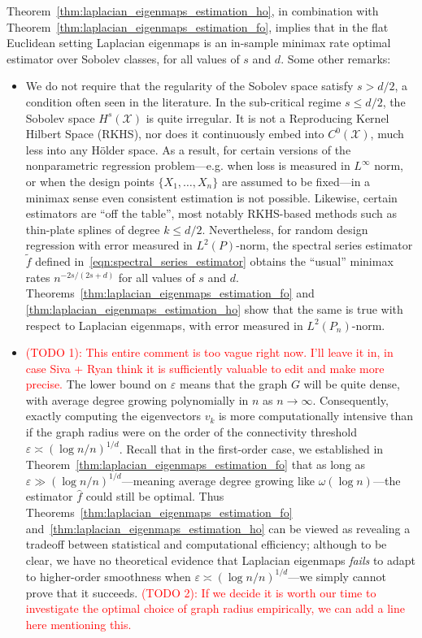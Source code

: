 \documentclass{article}
\newcommand{\1}{\mathbf{1}}
\newcommand{\Leb}{L}
\newcommand{\mc}[1]{\mathcal{#1}}
\newcommand{\wt}[1]{\widetilde{#1}}
\newcommand{\wh}[1]{\widehat{#1}}
\theoremstyle{alden}
\theoremstyle{aldenthm}
\theoremstyle{definition}
\theoremstyle{remark}
\begin{document}
Theorem~\ref{thm:laplacian_eigenmaps_estimation_ho}, in combination with Theorem~\ref{thm:laplacian_eigenmaps_estimation_fo}, implies that in the flat Euclidean setting Laplacian eigenmaps is an in-sample minimax rate optimal estimator over Sobolev classes, for all values of $s$ and $d$. Some other remarks:
\begin{itemize}
	\item We do not require that the regularity of the Sobolev space satisfy $s > d/2$, a condition often seen in the literature. In the sub-critical regime $s \leq d/2$, the Sobolev space $H^s(\mc{X})$ is quite irregular. It is not a Reproducing Kernel Hilbert Space (RKHS), nor does it continuously embed into $C^0(\mc{X})$, much less into any H\"{o}lder space. As a result, for certain versions of the nonparametric regression problem---e.g. when loss is measured in $\Leb^{\infty}$ norm, or when the design points $\{X_1,\ldots,X_n\}$ are assumed to be fixed---in a minimax sense even consistent estimation is not possible. Likewise, certain estimators are ``off the table'', most notably RKHS-based methods such as thin-plate splines of degree $k \leq d/2$. Nevertheless, for random design regression with error measured in $\Leb^2(P)$-norm, the spectral series estimator $\wt{f}$ defined in~\eqref{eqn:spectral_series_estimator} obtains the ``usual'' minimax rates $n^{-2s/(2s + d)}$ for all values of $s$ and $d$. Theorems~\ref{thm:laplacian_eigenmaps_estimation_fo} and \ref{thm:laplacian_eigenmaps_estimation_ho} show that the same is true with respect to Laplacian eigenmaps, with error measured in $\Leb^2(P_n)$-norm.
	\item \textcolor{red}{(TODO 1): This entire comment is too vague right now. I'll leave it in, in case Siva + Ryan think it is sufficiently valuable to edit and make more precise.} The lower bound on $\varepsilon$ means that the graph $G$ will be quite dense, with average degree growing polynomially in $n$ as $n \to \infty$. Consequently, exactly computing the eigenvectors $v_k$ is more computationally intensive than if the graph radius were on the order of the connectivity threshold $\varepsilon \asymp (\log n/n)^{1/d}$. Recall that in the first-order case, we established in Theorem~\ref{thm:laplacian_eigenmaps_estimation_fo} that as long as $\varepsilon \gg (\log n/n)^{1/d}$---meaning average degree growing like $\omega(\log n)$---the estimator $\wh{f}$ could still be optimal. Thus Theorems~\ref{thm:laplacian_eigenmaps_estimation_fo} and~\ref{thm:laplacian_eigenmaps_estimation_ho} can be viewed as revealing a tradeoff between statistical and computational efficiency; although to be clear, we have no theoretical evidence that Laplacian eigenmaps \emph{fails} to adapt to higher-order smoothness when $\varepsilon \asymp (\log n/n)^{1/d}$---we simply cannot prove that it succeeds. 
	\textcolor{red}{(TODO 2): If we decide it is worth our time to investigate the optimal choice of graph radius empirically, we can add a line here mentioning this.}
	

\end{itemize}
\end{document}
